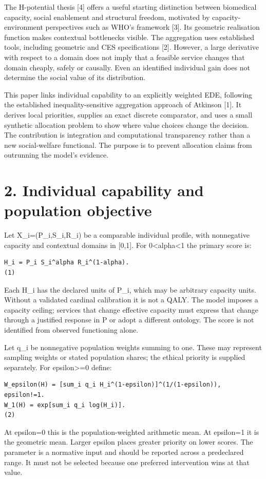 \documentclass[11pt,a4paper]{article}
\begin{document}
The H-potential thesis [4] offers a useful starting distinction between biomedical capacity, social enablement and structural freedom, motivated by capacity-environment perspectives such as WHO's framework [3]. Its geometric realisation function makes contextual bottlenecks visible. The aggregation uses established tools, including geometric and CES specifications [2]. However, a large derivative with respect to a domain does not imply that a feasible service changes that domain cheaply, safely or causally. Even an identified individual gain does not determine the social value of its distribution.

This paper links individual capability to an explicitly weighted EDE, following the established inequality-sensitive aggregation approach of Atkinson [1]. It derives local priorities, supplies an exact discrete comparator, and uses a small synthetic allocation problem to show where value choices change the decision. The contribution is integration and computational transparency rather than a new social-welfare functional. The purpose is to prevent allocation claims from outrunning the model's evidence.

\section*{2. Individual capability and population objective}
Let X\_i=(P\_i,S\_i,R\_i) be a comparable individual profile, with nonnegative capacity and contextual domains in [0,1]. For 0\textless{}alpha\textless{}1 the primary score is:

{\footnotesize\begin{verbatim}
H_i = P_i S_i^alpha R_i^(1-alpha).                                    (1)
\end{verbatim}}
Each H\_i has the declared units of P\_i, which may be arbitrary capacity units. Without a validated cardinal calibration it is not a QALY. The model imposes a capacity ceiling; services that change effective capacity must express that change through a justified response in P or adopt a different ontology. The score is not identified from observed functioning alone.

Let q\_i be nonnegative population weights summing to one. These may represent sampling weights or stated population shares; the ethical priority is supplied separately. For epsilon\textgreater{}=0 define:

{\footnotesize\begin{verbatim}
W_epsilon(H) = [sum_i q_i H_i^(1-epsilon)]^(1/(1-epsilon)), epsilon!=1.
W_1(H) = exp[sum_i q_i log(H_i)].                                     (2)
\end{verbatim}}
At epsilon=0 this is the population-weighted arithmetic mean. At epsilon=1 it is the geometric mean. Larger epsilon places greater priority on lower scores. The parameter is a normative input and should be reported across a predeclared range. It must not be selected because one preferred intervention wins at that value.
\end{document}
